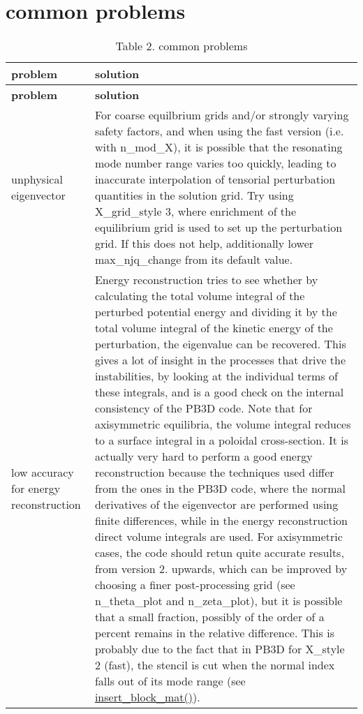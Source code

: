 \hypertarget{page_faq_faq_problems}{}\section{common problems}\label{page_faq_faq_problems}
\hypertarget{page_faq_faq_problems_tab}{}
\tabulinesep=1mm
\begin{longtabu} spread 0pt [c]{*{2}{|X[-1]}|}
\caption{Table 2. common problems}\label{page_faq_faq_problems_tab}\\
\hline
\rowcolor{\tableheadbgcolor}\textbf{ problem }&\textbf{ solution   }\\
\endfirsthead
\hline
\endfoot
\hline
\rowcolor{\tableheadbgcolor}\textbf{ problem }&\textbf{ solution   }\\
\endhead
unphysical eigenvector &For coarse equilbrium grids and/or strongly varying safety factors, and when using the fast version (i.\+e. with {\ttfamily n\+\_\+mod\+\_\+X}), it is possible that the resonating mode number range varies too quickly, leading to inaccurate interpolation of tensorial perturbation quantities in the solution grid. Try using {\ttfamily X\+\_\+grid\+\_\+style} 3, where enrichment of the equilibrium grid is used to set up the perturbation grid. If this does not help, additionally lower {\ttfamily max\+\_\+njq\+\_\+change} from its default value.   \\
low accuracy for energy reconstruction &Energy reconstruction tries to see whether by calculating the total volume integral of the perturbed potential energy and dividing it by the total volume integral of the kinetic energy of the perturbation, the eigenvalue can be recovered. This gives a lot of insight in the processes that drive the instabilities, by looking at the individual terms of these integrals, and is a good check on the internal consistency of the P\+B3D code. Note that for axisymmetric equilibria, the volume integral reduces to a surface integral in a poloidal cross-\/section. It is actually very hard to perform a good energy reconstruction because the techniques used differ from the ones in the P\+B3D code, where the normal derivatives of the eigenvector are performed using finite differences, while in the energy reconstruction direct volume integrals are used. For axisymmetric cases, the code should retun quite accurate results, from version 2. upwards, which can be improved by choosing a finer post-\/processing grid (see {\ttfamily n\+\_\+theta\+\_\+plot} and {\ttfamily n\+\_\+zeta\+\_\+plot}), but it is possible that a small fraction, possibly of the order of a percent remains in the relative difference. This is probably due to the fact that in P\+B3D for {\ttfamily X\+\_\+style} 2 (fast), the stencil is cut when the normal index falls out of its mode range (see \hyperlink{namespaceslepc__utilities_aa34aa361f0bfff9621ecba179f9ed0c6}{insert\+\_\+block\+\_\+mat()}).   \\
\end{longtabu}

